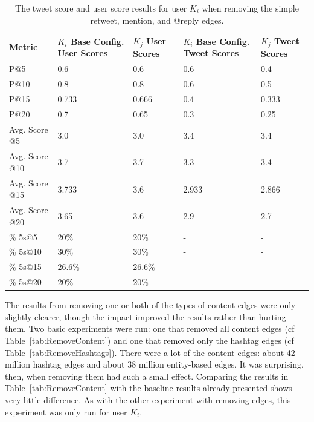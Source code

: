 \begin{table}
\centering
\begin{tabular}{l|p{2cm}|p{2cm}|p{2cm}|p{2cm}}
{\bf Metric} & {\bf $K_{i}$ Base Config. User Scores} & {\bf $K_{j}$ User Scores} & {\bf $K_{i}$ Base Config. Tweet Scores} & {\bf $K_{j}$ Tweet Scores} \\ \hline
P@5   & 0.6 & 0.6 & 0.6 & 0.4 \\ \hline
P@10 & 0.8 & 0.8 & 0.6 & 0.5 \\ \hline
P@15 & 0.733 & 0.666 & 0.4 & 0.333 \\ \hline
P@20 & 0.7 & 0.65 & 0.3 & 0.25 \\ \hline

Avg. Score @5   & 3.0 & 3.0 & 3.4 & 3.4 \\ \hline
Avg. Score @10 & 3.7 & 3.7 & 3.3 & 3.4 \\ \hline
Avg. Score @15 & 3.733 & 3.6 & 2.933 & 2.866 \\ \hline
Avg. Score @20 & 3.65 & 3.6 & 2.9 & 2.7 \\ \hline

\% 5s@5    & 20\% & 20\% & - & - \\ \hline
\% 5s@10  & 30\% & 30\% & - & - \\ \hline
\% 5s@15  & 26.6\% & 26.6\% & - & - \\ \hline
\% 5s@20  & 20\% & 20\% & - & - \\

\end{tabular}
\caption{The tweet score and user score results for user $K_{i}$ when removing the simple retweet, mention, and @reply edges.}
\label{tab:Remove369}
\end{table}



The results from removing one or both of the types of content edges were only slightly clearer, though the impact improved the results rather than hurting them. Two basic experiments were run: one that removed all content edges (cf Table~\ref{tab:RemoveContent}) and one that removed only the hashtag edges (cf Table~\ref{tab:RemoveHashtags}). There were a lot of the content edges: about 42 million hashtag edges and about 38 million entity-based edges. It was surprising, then, when removing them had such a small effect. Comparing the results in Table~\ref{tab:RemoveContent} with the baseline results already presented shows very little difference. As with the other experiment with removing edges, this experiment was only run for user $K_{i}$.

